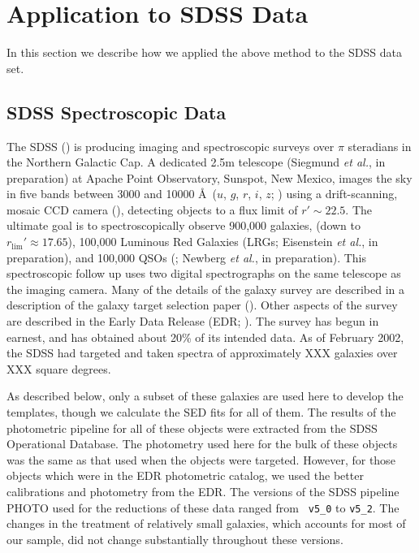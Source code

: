 \documentclass[10pt,preprint]{aastex}
\begin{document}
\section{Application to SDSS Data}
\label{data}

In this section we describe how we applied the above method to the
SDSS data set.

\subsection{SDSS Spectroscopic Data}

The SDSS (\citealt{york00a}) is producing imaging and spectroscopic
surveys over $\pi$ steradians in the Northern Galactic Cap. A
dedicated 2.5m telescope (Siegmund {\it et al.}, in preparation) at
Apache Point Observatory, Sunspot, New Mexico, images the sky in five
bands between 3000 and 10000 \AA\ ($u$, $g$, $r$, $i$, $z$;
\citealt{fukugita96a}) using a drift-scanning, mosaic CCD camera
(\citealt{gunn98a}), detecting objects to a flux limit of $r'\sim
22.5$. The ultimate goal is to spectroscopically observe 900,000
galaxies, (down to $r_{\mathrm{lim}}'\approx 17.65$), 100,000 Luminous
Red Galaxies (LRGs; Eisenstein {\it et al.}, in preparation), and
100,000 QSOs (\citealt{fan99a}; Newberg {\it et al.}, in preparation).
This spectroscopic follow up uses two digital spectrographs on the
same telescope as the imaging camera. Many of the details of the
galaxy survey are described in a description of the galaxy target
selection paper (\citealt{strauss02a}). Other aspects of the survey
are described in the Early Data Release (EDR;
\citealt{stoughton01a}). The survey has begun in earnest, and has
obtained about 20\% of its intended data.  As of February 2002, the
SDSS had targeted and taken spectra of approximately XXX galaxies over
XXX square degrees.

As described below, only a subset of these galaxies are used here to
develop the templates, though we calculate the SED fits for all of
them. The results of the photometric pipeline for all of these objects
were extracted from the SDSS Operational Database. The
photometry used here for the bulk of these objects was the same as
that used when the objects were targeted. However, for those objects
which were in the EDR photometric catalog, we used the better
calibrations and photometry from the EDR. The versions of the SDSS
pipeline PHOTO used for the reductions of these data ranged from {\tt
v5\_0} to {\tt v5\_2}. The changes in the treatment of relatively
small galaxies, which accounts for most of our sample, did not change
substantially throughout these versions.
\end{document}
